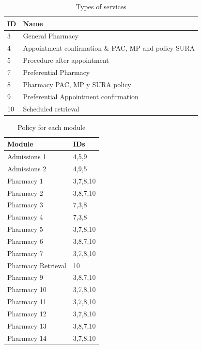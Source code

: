 {\renewcommand{\arraystretch}{1}
\begin{table}[H]
\centering
\begin{tabular}{ll}
\hline
\textbf{ID} & \textbf{Name}                                       \\ \hline
3           & General Pharmacy                                    \\
4           & Appointment confirmation \& PAC, MP and policy SURA \\
5           & Procedure after appointment                                             \\
7           & Preferential Pharmacy                               \\
8           & Pharmacy PAC, MP y SURA policy                      \\
9           & Preferential Appointment confirmation 
         \\
10       & Scheduled retrieval    
\\ \hline
\end{tabular}
\caption{Types of services}
\label{tab:types_serv}
\end{table}

\begin{table}[H]
\centering
\begin{tabular}{ll}
\hline
\textbf{Module}    & \textbf{IDs} \\ \hline
Admissions 1       & 4,5,9        \\
Admissions 2       & 4,9,5        \\
Pharmacy 1         & 3,7,8,10     \\
Pharmacy 2         & 3,8,7,10     \\
Pharmacy 3         & 7,3,8        \\
Pharmacy 4         & 7,3,8        \\
Pharmacy 5         & 3,7,8,10     \\
Pharmacy 6         & 3,8,7,10     \\
Pharmacy 7         & 3,7,8,10     \\
Pharmacy Retrieval & 10           \\
Pharmacy 9         & 3,8,7,10     \\
Pharmacy 10        & 3,7,8,10     \\
Pharmacy 11        & 3,7,8,10     \\
Pharmacy 12        & 3,7,8,10     \\
Pharmacy 13        & 3,8,7,10     \\
Pharmacy 14        & 3,7,8,10     \\\hline
\end{tabular}
\caption{Policy for each module}
\label{tab:pol_mod}
\end{table}
}

